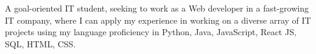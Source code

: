 \documentclass[10pt,a4paper,ragged2e,withhyper]{altacv}
\begin{document}


\makecvheader
A goal-oriented IT student, seeking to work as a Web developer in a fast-growing IT company, where I can apply my experience in working on a diverse array of IT projects using my language proficiency in Python, Java, JavaScript, React JS, SQL, HTML, CSS.



\end{document}
